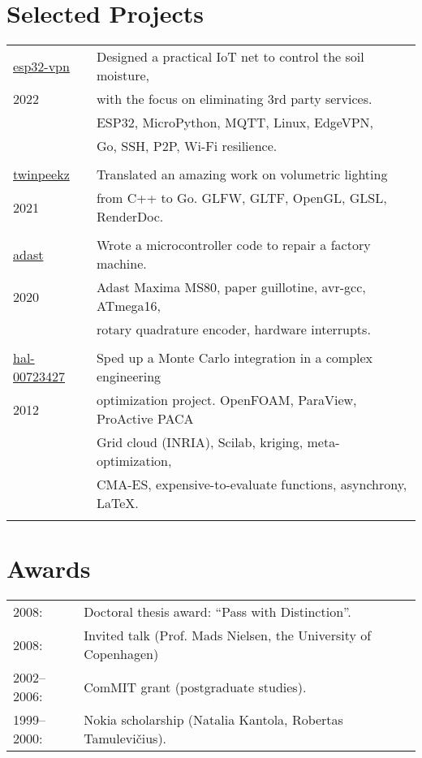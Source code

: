 \documentclass[a4paper,11pt]{article}
\begin{document}
\section*{Selected Projects}
\label{sect:pubs}

\begin{tabular}{ll}
\href{https://github.com/aabbtree77/esp32-vpn}{esp32-vpn} & Designed a practical IoT net to control the soil moisture,\\
                2022       & with the focus on eliminating 3rd party services. \\  
                       & ESP32, MicroPython, MQTT, Linux, EdgeVPN, \\
                       & Go, SSH, P2P, Wi-Fi resilience. \\
                       &\\
\href{https://github.com/aabbtree77/twinpeekz}{twinpeekz}    & Translated an amazing work on volumetric lighting \\
                   2021       & from C++ to Go. GLFW, GLTF, OpenGL, GLSL, RenderDoc. \\
                          &\\
\href{https://github.com/aabbtree77/adast}{adast} & Wrote a microcontroller code to repair a factory machine. \\
2020 & Adast Maxima MS80, paper guillotine, avr-gcc, ATmega16, \\
     & rotary quadrature encoder, hardware interrupts. \\
     &\\                        
\href{https://hal.archives-ouvertes.fr/hal-00723427}{hal-00723427} & Sped up a Monte Carlo integration in a complex engineering \\
                     2012             & optimization project. OpenFOAM, ParaView, ProActive PACA \\
                                  & Grid cloud (INRIA), Scilab, kriging, meta-optimization, \\
                                  & CMA-ES, expensive-to-evaluate functions, asynchrony, LaTeX. \\
                          &          
\end{tabular}

%


%
%
\section*{Awards}
%
\begin{tabular}{ll}
        2008: & Doctoral thesis award: “Pass with Distinction”.\\
        2008: & Invited talk (Prof. Mads Nielsen, the University of Copenhagen)\\
        2002--2006:& ComMIT grant (postgraduate studies).\\
        1999--2000:& Nokia scholarship (Natalia Kantola, Robertas Tamulevi\v{c}ius).
\end{tabular}
%
%

\end{document}

